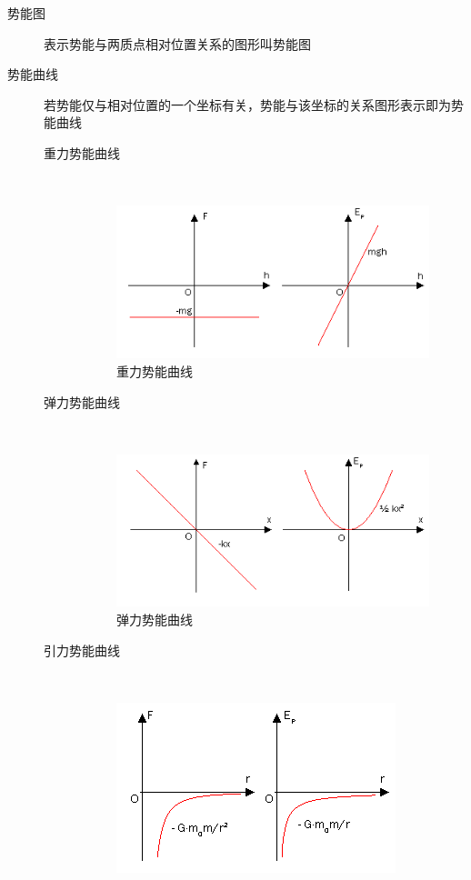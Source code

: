 \begin{description}
\item[势能图]表示势能与两质点相对位置关系的图形叫势能图
\item[势能曲线]若势能仅与相对位置的一个坐标有关，势能与该坐标的关系图形表示即为势能曲线
\begin{description}
\item[重力势能曲线]$\ $
\begin{figure} [ht]
\centering
\includegraphics[scale=.6]{PotentialEnergy_Gravitational2.png}
\caption{\simsun 重力势能曲线}
\label{PotentialEnergy_Gravitational2}
\end{figure}
\item[弹力势能曲线]$\ $
\begin{figure} [ht]
\centering
\includegraphics[scale=.6]{PotentialEnergy_Elastic.png}
\caption{\simsun 弹力势能曲线}
\label{PotentialEnergy_Elastic}
\end{figure}
\item[引力势能曲线] $\ $
\begin{figure} [ht]
\centering
\includegraphics[scale=.6]{PotentialEnergy_Gravitational1.png}

\end{figure}
\end{description}
\end{description}
